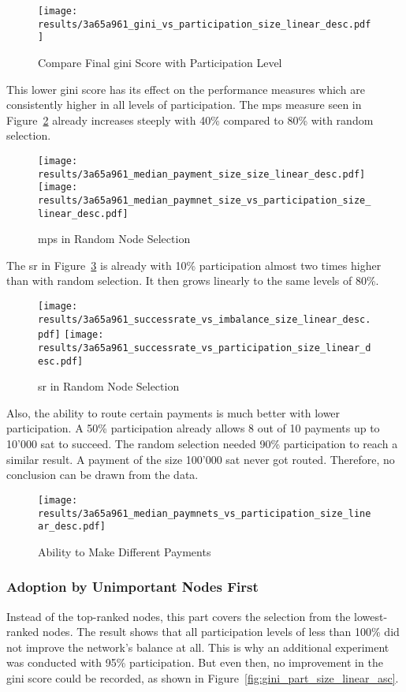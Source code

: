 \documentclass[final]{fhnwreport}       %
\begin{document}
\begin{figure}[H]
\centering
\texttt{[image: results/3a65a961\_gini\_vs\_participation\_size\_linear\_desc.pdf]}
\caption{Compare Final \gls{gini} Score with Participation Level}
\label{fig:gini_part_size_linear_desc}
\end{figure}

This lower \gls{gini} score has its effect on the performance measures which are consistently higher in all levels of participation. The \gls{mps} measure seen in Figure~\ref{fig:pay_size_size_linear_desc} already increases steeply with 40\% compared to 80\% with random selection.

\begin{figure}[htp]
\centering
\texttt{[image: results/3a65a961\_median\_payment\_size\_size\_linear\_desc.pdf]}\hfill
\texttt{[image: results/3a65a961\_median\_paymnet\_size\_vs\_participation\_size\_linear\_desc.pdf]}
\caption{\gls{mps} in Random Node Selection}
\label{fig:pay_size_size_linear_desc}
\end{figure}


The \gls{sr} in Figure~\ref{fig:success_size_linear_desc} is already with 10\% participation almost two times higher than with random selection. It then grows linearly to the same levels of 80\%.

\begin{figure}[htp]
\centering
\texttt{[image: results/3a65a961\_successrate\_vs\_imbalance\_size\_linear\_desc.pdf]}\hfill
\texttt{[image: results/3a65a961\_successrate\_vs\_participation\_size\_linear\_desc.pdf]}
\caption{\gls{sr} in Random Node Selection}
\label{fig:success_size_linear_desc}
\end{figure}

Also, the ability to route certain payments is much better with lower participation. A 50\% participation already allows 8 out of 10 payments up to 10'000 sat to succeed. The random selection needed 90\% participation to reach a similar result. A payment of the size 100'000 sat never got routed. Therefore, no conclusion can be drawn from the data.

\begin{figure}[htp]
\centering
\texttt{[image: results/3a65a961\_median\_paymnets\_vs\_participation\_size\_linear\_desc.pdf]}
\caption{Ability to Make Different Payments}
\label{fig:sizes_size_linear_desc}
\end{figure}


\subsubsection{Adoption by Unimportant Nodes First}\label{subsub:asc}
Instead of the top-ranked nodes, this part covers the selection from the lowest-ranked nodes. The result shows that all participation levels of less than 100\% did not improve the network's balance at all. This is why an additional experiment was conducted with 95\% participation. But even then, no improvement in the \gls{gini} score could be recorded, as shown in Figure~\ref{fig:gini_part_size_linear_asc}.
\end{document}
